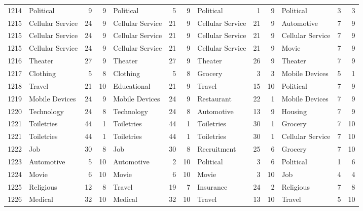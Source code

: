 \begin{figure}[htbp]
\begin{tabular}{rlrrlrrlrrlrr}
    1214  & Political & 9     & 9     & Political & 5     & 9     & Political & 1     & 9     & Political & 3     & 3 \\
    1215  & Cellular Service & 24    & 9     & Cellular Service & 21    & 9     & Cellular Service & 21    & 9     & Automotive & 7     & 9 \\
    1215  & Cellular Service & 24    & 9     & Cellular Service & 21    & 9     & Cellular Service & 21    & 9     & Cellular Service & 7     & 9 \\
    1215  & Cellular Service & 24    & 9     & Cellular Service & 21    & 9     & Cellular Service & 21    & 9     & Movie & 7     & 9 \\
    1216  & Theater & 27    & 9     & Theater & 27    & 9     & Theater & 26    & 9     & Theater & 7     & 9 \\
    1217  & Clothing & 5     & 8     & Clothing & 5     & 8     & Grocery & 3     & 3     & Mobile Devices & 5     & 1 \\
    1218  & Travel & 21    & 10    & Educational & 21    & 9     & Travel & 15    & 10    & Political & 7     & 9 \\
    1219  & Mobile Devices & 24    & 9     & Mobile Devices & 24    & 9     & Restaurant & 22    & 1     & Mobile Devices & 7     & 9 \\
    1220  & Technology & 24    & 8     & Technology & 24    & 8     & Automotive & 13    & 9     & Housing & 7     & 9 \\
    1221  & Toiletries & 44    & 1     & Toiletries & 44    & 1     & Toiletries & 30    & 1     & Grocery & 7     & 10 \\
    1221  & Toiletries & 44    & 1     & Toiletries & 44    & 1     & Toiletries & 30    & 1     & Cellular Service & 7     & 10 \\
    1222  & Job   & 30    & 8     & Job   & 30    & 8     & Recruitment & 25    & 6     & Grocery & 7     & 10 \\
    1223  & Automotive & 5     & 10    & Automotive & 2     & 10    & Political & 3     & 6     & Political & 1     & 6 \\
    1224  & Movie & 6     & 10    & Movie & 6     & 10    & Movie & 3     & 10    & Job   & 4     & 4 \\
    1225  & Religious & 12    & 8     & Travel & 19    & 7     & Insurance & 24    & 2     & Religious & 7     & 8 \\
    1226  & Medical & 32    & 10    & Medical & 32    & 10    & Travel & 13    & 10    & Travel & 5     & 10 \\

\end{tabular}
\end{figure}
